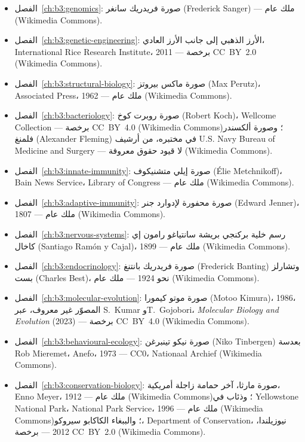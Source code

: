 \begin{itemize}
  \item الفصل~\ref{ch:b3:genomics}: صورة فريدريك سانغر
        (Frederick Sanger) --- ملك عام (Wikimedia Commons).
  \item الفصل~\ref{ch:b3:genetic-engineering}: الأرز الذهبي إلى جانب
        الأرز العادي، International Rice Research Institute، 2011 ---
        برخصة CC~BY~2.0 (Wikimedia Commons).
  \item الفصل~\ref{ch:b3:structural-biology}: صورة ماكس بيروتز
        (Max Perutz)، Associated Press، 1962 --- ملك عام
        (Wikimedia Commons).
  \item الفصل~\ref{ch:b3:bacteriology}: صورة روبرت كوخ (Robert Koch)،
        Wellcome Collection --- برخصة CC~BY~4.0 (Wikimedia Commons)؛
        وصورة ألكسندر فلمنغ (Alexander Fleming) في مختبره، من أرشيف
        U.S. Navy Bureau of Medicine and Surgery --- لا قيود حقوق
        معروفة (Wikimedia Commons).
  \item الفصل~\ref{ch:b3:innate-immunity}: صورة إيلي متشنيكوف
        (Élie Metchnikoff)، Bain News Service، Library of Congress ---
        ملك عام (Wikimedia Commons).
  \item الفصل~\ref{ch:b3:adaptive-immunity}: صورة محفورة لإدوارد جنر
        (Edward Jenner)، 1807 --- ملك عام (Wikimedia Commons).
  \item الفصل~\ref{ch:b3:nervous-systems}: رسم خلية بركنجي بريشة
        سانتياغو رامون إي كاخال (Santiago Ramón y Cajal)، 1899 ---
        ملك عام (Wikimedia Commons).
  \item الفصل~\ref{ch:b3:endocrinology}: صورة فريدريك بانتنغ
        (Frederick Banting) وتشارلز بست (Charles Best)، نحو 1924 ---
        ملك عام (Wikimedia Commons).
  \item الفصل~\ref{ch:b3:molecular-evolution}: صورة موتو كيمورا
        (Motoo Kimura)، 1986، المصوّر غير معروف، عبر S.~Kumar
        وT.~Gojobori، \emph{Molecular Biology and Evolution} (2023) ---
        برخصة CC~BY~4.0 (Wikimedia Commons).
  \item الفصل~\ref{ch:b3:behavioural-ecology}: صورة نيكو تينبرغن
        (Niko Tinbergen) بعدسة Rob Mieremet، Anefo، 1973 --- CC0،
        Nationaal Archief (Wikimedia Commons).
  \item الفصل~\ref{ch:b3:conservation-biology}: صورة مارثا، آخر حمامة
        زاجلة أمريكية، Enno Meyer، 1912 --- ملك عام
        (Wikimedia Commons)؛ وذئاب في Yellowstone National Park،
        National Park Service، 1996 --- ملك عام (Wikimedia Commons)؛
        والببغاء الكاكابو سيروكو، Department of Conservation،
        نيوزيلندا، 2012 --- برخصة CC~BY~2.0 (Wikimedia Commons).
\end{itemize}

